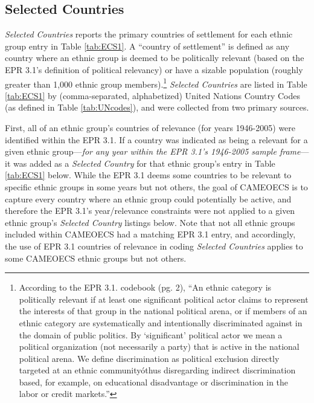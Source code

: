 \documentclass[12pt]{article}
\begin{document}
\subsection{Selected Countries}
\textit{Selected Countries} reports the primary countries of settlement for each ethnic group entry in Table \ref{tab:ECS1}.  A ``country of settlement'' is defined as any country where an ethnic group is deemed to be politically relevant (based on the EPR 3.1's definition of political relevancy) or have a sizable population (roughly greater than 1,000 ethnic group members).\footnote{According to the EPR 3.1. codebook (pg. 2), ``An ethnic category is politically relevant if at least one significant political actor claims to represent the interests of that group in the national political arena, or if members of an ethnic category are systematically and intentionally discriminated against in the domain of public politics. By `significant' political actor we mean a political organization (not necessarily a party) that is active in the national political arena. We define discrimination as political exclusion directly targeted at an ethnic communityóthus disregarding indirect discrimination based, for example, on educational disadvantage or discrimination in the labor or credit markets.''}  \textit{Selected Countries} are listed in Table \ref{tab:ECS1} by (comma-separated, alphabetized) United Nations Country Codes (as defined in Table \ref{tab:UNcodes}), and were collected from two primary sources.

First, all of an ethnic group's countries of relevance (for years 1946-2005) were identified within the EPR 3.1.  If a country was indicated as being a relevant for a given ethnic group---\textit{for any year within the EPR 3.1's 1946-2005 sample frame}---it was added as a \textit{Selected Country} for that ethnic group's entry in Table \ref{tab:ECS1} below.  While the EPR 3.1 deems some countries to be relevant to specific ethnic groups in some years but not others, the goal of CAMEOECS is to capture every country where an ethnic group could potentially be active, and therefore the EPR 3.1's year/relevance constraints were not applied to a given ethnic group's \textit{Selected Country} listings below.  Note that not all ethnic groups included within CAMEOECS had a matching EPR 3.1 entry, and accordingly, the use of EPR 3.1 countries of relevance in coding \textit{Selected Countries} applies to some CAMEOECS ethnic groups but not others.
\end{document}
